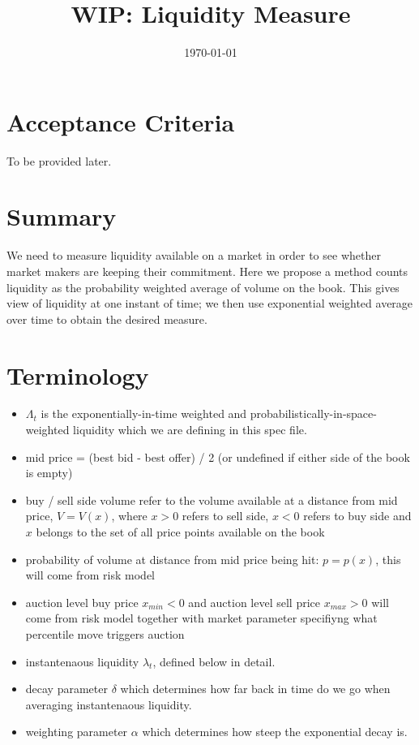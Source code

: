 \documentclass[10pt]{amsart}
\title{WIP: Liquidity Measure}
\date{
    \today\\
}
\begin{document}
\maketitle
\section*{Acceptance Criteria}

To be provided later.

\section*{Summary}
We need to measure liquidity available on a market in order to see whether market makers are keeping 
their commitment. 
Here we propose a method counts liquidity as the probability weighted average of volume on the book. 
This gives view of liquidity at one instant of time; we then use exponential weighted average over time to obtain the desired measure.

\section*{Terminology}
\begin{itemize}
\item $\Lambda_t$ is the exponentially-in-time weighted and probabilistically-in-space-weighted liquidity which we are defining in this spec file.
\item  mid price = (best bid - best offer) / 2 (or undefined if either side of the book is empty)
\item buy / sell side volume refer to the volume available at a distance from mid price, $V = V(x)$, where $x > 0$ refers to sell side, $x < 0$ refers to buy side and $x$ belongs to the set of all price points available on the book
\item probability of volume at distance from mid price being hit: $p = p(x)$, this will come from risk model
\item auction level buy price $x_{min} < 0$ and auction level sell price $x_{max} > 0$ will come from risk model together with market parameter specifiyng what percentile move triggers auction  
\item instantenaous liquidity $\lambda_t$, defined below in detail.
\item decay parameter $\delta$ which determines how far back in time do we go when averaging instantenaous liquidity.
\item weighting parameter $\alpha$ which determines how steep the exponential decay is.

\end{itemize}
\end{document}
